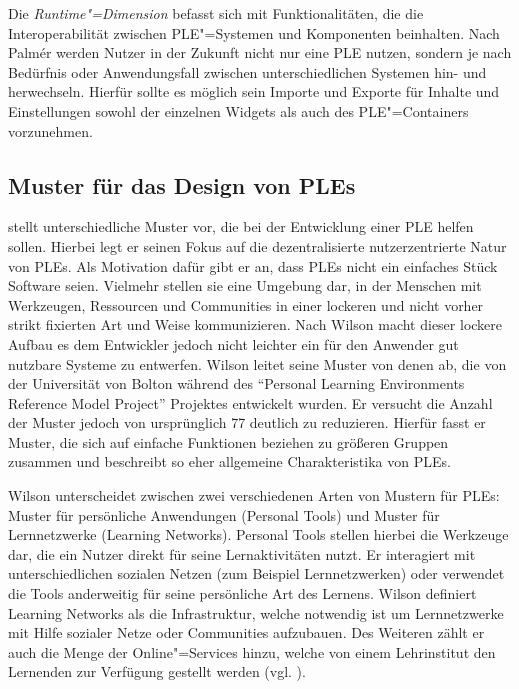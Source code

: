 Die \emph{Runtime"=Dimension} befasst sich mit Funktionalitäten, die die Interoperabilität zwischen \ac{PLE}"=Systemen und Komponenten beinhalten. Nach Palmér werden Nutzer in der Zukunft nicht nur eine \ac{PLE} nutzen, sondern je nach Bedürfnis oder Anwendungsfall zwischen unterschiedlichen Systemen hin- und herwechseln. Hierfür sollte es möglich sein Importe und Exporte für Inhalte und Einstellungen sowohl der einzelnen Widgets als auch des \ac{PLE}"=Containers vorzunehmen.

\subsection{Muster für das Design von \acp{PLE}}\label{section:wilson_patterns}
\cite{Wilson2008} stellt unterschiedliche Muster vor, die bei der Entwicklung einer \ac{PLE} helfen sollen. Hierbei legt er seinen Fokus auf die dezentralisierte  nutzerzentrierte Natur von \acp{PLE}. Als Motivation dafür gibt er an, dass \acp{PLE} nicht ein einfaches Stück Software seien. Vielmehr stellen sie eine Umgebung dar, in der Menschen mit Werkzeugen, Ressourcen und Communities in einer lockeren und nicht vorher strikt fixierten Art und Weise kommunizieren. Nach Wilson macht dieser lockere Aufbau es dem Entwickler jedoch nicht leichter ein für den Anwender gut nutzbare Systeme zu entwerfen. Wilson leitet seine Muster von denen ab, die von der Universität von Bolton während des "`Personal Learning Environments Reference Model Project"' Projektes entwickelt wurden. Er versucht die Anzahl der Muster jedoch von ursprünglich 77 deutlich zu reduzieren. Hierfür fasst er Muster, die sich auf einfache Funktionen beziehen zu größeren Gruppen zusammen und beschreibt so eher allgemeine Charakteristika von \acp{PLE}.

Wilson unterscheidet zwischen zwei verschiedenen Arten von Mustern für \acp{PLE}: Muster für persönliche Anwendungen (Personal Tools) und Muster für Lernnetzwerke (Learning Networks). Personal Tools stellen hierbei die Werkzeuge dar, die ein Nutzer direkt für seine Lernaktivitäten nutzt. Er interagiert mit unterschiedlichen sozialen Netzen (zum Beispiel Lernnetzwerken) oder verwendet die Tools anderweitig für seine persönliche Art des Lernens. 
Wilson definiert Learning Networks als die Infrastruktur, welche notwendig ist um Lernnetzwerke mit Hilfe sozialer Netze oder Communities aufzubauen. Des Weiteren zählt er auch die Menge der Online"=Services hinzu, welche von einem Lehrinstitut den Lernenden zur Verfügung gestellt werden (vgl. \cite{Wilson2008}).

